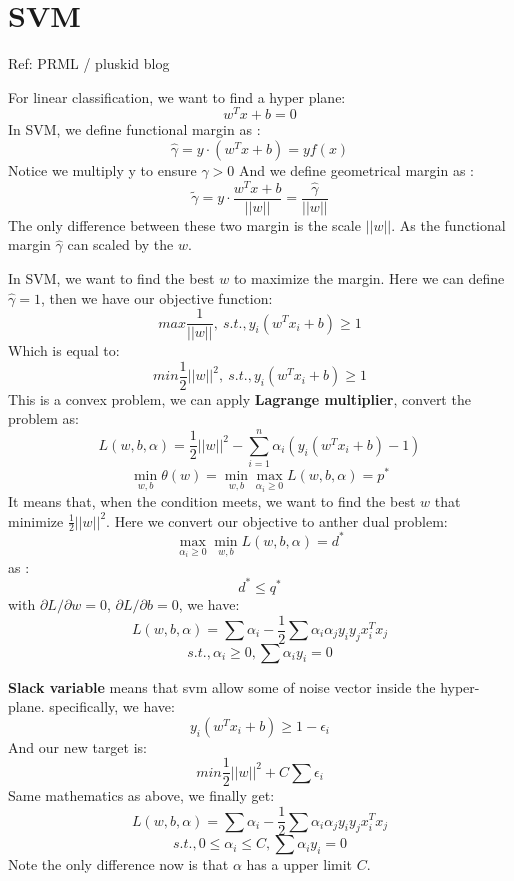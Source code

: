 \documentclass{article}
\begin{document}
\section{SVM}
Ref: PRML / pluskid blog

For linear classification, we want to find a hyper plane:
$$w^{T}x+b=0$$
In SVM, we define functional margin as :
$$\widehat{\gamma}=y \cdot (w^{T}x+b) = yf(x) $$
Notice we multiply y to ensure $\widehat{\gamma} >0$
And we define geometrical margin as :
$$\widetilde{\gamma}= y \cdot \frac{w^{T}x+b}{||w||} = \frac{\widehat{\gamma}}{||w||} $$
The only difference between these two margin is the scale $||w||$. As the functional margin $\widehat{\gamma}$ can scaled by the $w$. 

In SVM, we want to find the best $w$ to maximize the margin. Here we can define $\widehat{\gamma}=1$, then we have our objective function:
$$max \frac{1}{||w||},\ s.t.,y_{i}(w^{T}x_{i}+b) \ge 1 $$
Which is equal to: 
$$min \frac{1}{2}||w||^{2},\ s.t.,y_{i}(w^{T}x_{i}+b) \ge 1 $$
This is a convex problem, we can apply \textbf{Lagrange multiplier}, convert the problem as:
$$L(w,b,\alpha)=\frac{1}{2}||w||^{2}-\sum_{i=1}^{n}\alpha_{i}(y_{i}(w^{T}x_{i}+b)-1)$$
$$\min \limits_{w,b}\theta(w)=\min \limits_{w,b} \max \limits_{\alpha_{i} \ge 0} L(w,b,\alpha)=p^{*} $$
It means that, when the condition meets, we want to find the best $w$ that minimize $\frac{1}{2}||w||^{2}$. 
Here we convert our objective to anther dual problem:
$$\max \limits_{\alpha_{i} \ge 0} \min \limits_{w,b}  L(w,b,\alpha) =d^{*} $$
as :
$$d^{*} \leq q^{*}$$ 
with $\partial L / \partial w =0 $, $\partial L / \partial b =0 $, we have:
$$L(w,b,\alpha)=\sum \alpha_{i}-\frac{1}{2}\sum \alpha_{i}\alpha_{j}y_{i}y_{j}x_{i}^{T}x_{j}$$
$$s.t., \alpha_{i} \ge 0, \sum \alpha_{i}y_{i}=0 $$

\textbf{Slack variable} means that svm allow some of noise vector inside the hyper-plane. specifically, we have:
$$y_{i}(w^{T}x_{i}+b) \ge 1 - \epsilon_{i}$$
And our new target is: 
$$min \frac{1}{2} ||w||^{2} +C\sum \epsilon_{i}$$
Same mathematics as above, we finally get: 
$$L(w,b,\alpha)=\sum \alpha_{i}-\frac{1}{2}\sum \alpha_{i}\alpha_{j}y_{i}y_{j}x_{i}^{T}x_{j}$$
$$s.t.,  0 \leq \alpha_{i} \leq C, \sum \alpha_{i}y_{i}=0 $$
Note the only difference now is that $\alpha$ has a upper limit $C$. 



\end{document}
